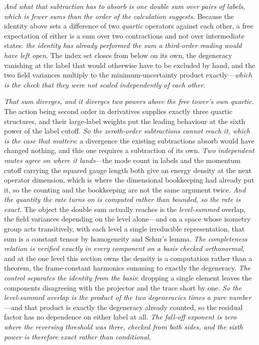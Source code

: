 \documentclass[11pt,a4paper]{article}
\theoremstyle{plain}
\theoremstyle{definition}
\theoremstyle{remark}
\begin{document}
\emph{And what that subtraction has to absorb is one double sum over pairs of labels, which is fewer sums
than the order of the calculation suggests.} Because the identity above sets a difference of two
\emph{quartic} operators against each other, a free expectation of either is a sum over two contractions and
not over intermediate states: \emph{the identity has already performed the sum a third-order reading would
have left open}. The index set closes from below on its own, the degeneracy vanishing at the label that would
otherwise have to be excluded by hand, and the two field variances multiply to the minimum-uncertainty
product exactly---\emph{which is the check that they were not scaled independently of each other}.

\emph{That sum diverges, and it diverges two powers above the free tower's own quartic.} The action being
second order in derivatives supplies exactly three quartic structures, and their large-label weights put the
leading behaviour at the sixth power of the label cutoff. \emph{So the zeroth-order subtractions cannot reach
it, which is the case that matters}: a divergence the existing subtractions absorb would have changed
nothing, and this one requires a subtraction of its own. \emph{Two independent routes agree on where it
lands}---the mode count in labels and the momentum cutoff carrying the squared gauge length both give an
energy density at the next operator dimension, which is where the dimensional bookkeeping had already put
it, so the counting and the bookkeeping are not the same argument twice. \emph{And the quantity the rate turns on is computed rather than bounded, so the rate is exact.} The
object the double sum actually reaches is the \emph{level-summed} overlap, the field variances depending on
the level alone---and on a space whose isometry group acts transitively, with each level a single
irreducible representation, that sum is a constant tensor by homogeneity and Schur's lemma. \emph{The
completeness relation is verified exactly in every component on a basis checked orthonormal}, and at the one
level this section owns the density is a computation rather than a theorem, the frame-constant harmonics
summing to exactly the degeneracy. \emph{The control separates the identity from the basis}: dropping a
single element leaves the components disagreeing with the projector and the trace short by one.
\emph{So the level-summed overlap is the product of the two degeneracies times a pure number}---and that
product is exactly the degeneracy already counted, so the residual factor has no dependence on either label
at all. \emph{The fall-off exponent is zero where the reversing threshold was three, checked from both
sides, and the sixth power is therefore exact rather than conditional}.
\end{document}
